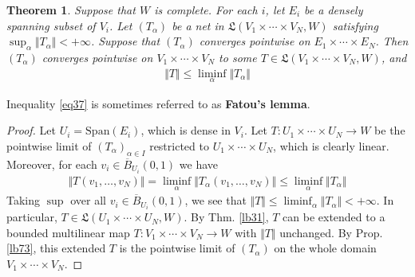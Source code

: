 \documentclass[12pt,b5paper,notitlepage]{article}
\theoremstyle{definition}
\theoremstyle{plain}
\newtheorem{thm}[df]{Theorem}
\newcommand{\fk}{\mathfrak}
\newcommand{\ovl}{\overline}
\newcommand{\Span}{\mathrm{Span}}
\numberwithin{equation}{section}
\begin{document}
\begin{thm}\label{lb32}
Suppose that $W$ is complete. For each $i$, let $E_i$ be a densely spanning subset of $V_i$. Let $(T_\alpha)$ be a net in $\fk L(V_1\times\cdots\times V_N,W)$ satisfying $\sup_\alpha\Vert T_\alpha\Vert<+\infty$. Suppose that $(T_\alpha)$ converges pointwise on $E_1\times\cdots\times E_N$. Then $(T_\alpha)$ converges pointwise on $V_1\times\cdots\times V_N$ to some $T\in\fk L(V_1\times\cdots\times V_N,W)$, and 
\begin{align}\label{eq37}
\Vert T\Vert\leq\liminf_\alpha\Vert T_\alpha\Vert
\end{align}
\end{thm}

Inequality \eqref{eq37} is sometimes referred to as \textbf{Fatou's lemma}.


\begin{proof}
Let $U_i=\Span(E_i)$, which is dense in $V_i$. Let $T:U_1\times\cdots\times U_N\rightarrow W$ be the pointwise limit of $(T_\alpha)_{\alpha\in I}$ restricted to $U_1\times\cdots\times U_N$, which is clearly linear. Moreover, for each $v_i\in\ovl B_{U_i}(0,1)$ we have
\begin{align*}
\Vert T(v_1,\dots,v_N)\Vert=\liminf_\alpha \Vert T_\alpha(v_1,\dots,v_N)\Vert\leq \liminf_\alpha \Vert T_\alpha\Vert
\end{align*}
Taking $\sup$ over all $v_i\in\ovl B_{U_i}(0,1)$, we see that $\Vert T\Vert\leq\liminf_\alpha\Vert T_\alpha\Vert<+\infty$. In particular, $T\in\fk L(U_1\times\cdots\times U_N,W)$. By Thm. \ref{lb31}, $T$ can be extended to a bounded multilinear map $T:V_1\times\cdots\times V_N\rightarrow W$ with $\Vert T\Vert$ unchanged. By Prop. \ref{lb73}, this extended $T$ is the pointwise limit of $(T_\alpha)$ on the whole domain $V_1\times\cdots\times V_N$. 
\end{proof}
\end{document}
